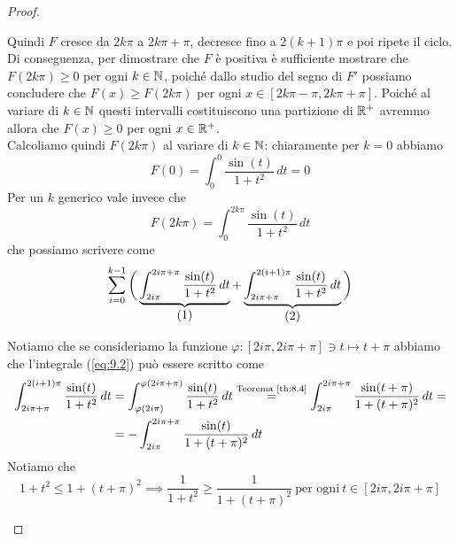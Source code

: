 \begin{proof}
\begin{enumerate}[(i)]
\begin{center}
        \end{center}
        Quindi $F$ cresce da $2k\pi$ a $2k\pi + \pi$, decresce fino a $2(k+1)\pi$ e poi ripete il ciclo. Di conseguenza, per dimostrare che $F$ è positiva è sufficiente mostrare che $F(2k\pi)\ge 0$ per ogni $k\in\amsbb{N}$, poiché dallo studio del segno di $F'$ possiamo concludere che $F(x)\ge F(2k\pi)$ per ogni $x\in[2k\pi -\pi , 2k\pi +\pi]$. Poiché al variare di $k\in\amsbb{N}$ questi intervalli costituiscono una partizione di $\amsbb{R}^+$ avremmo allora che $F(x)\ge 0$ per ogni $x\in\amsbb{R}^+$.\\
        Calcoliamo quindi $F(2k\pi)$ al variare di $k\in\amsbb{N}$: chiaramente per $k=0$ abbiamo
        \[
        F(0) =  \int_0^0 \frac{\sin(t)}{1+t^2}\, dt = 0
        \]
        Per un $k$ generico vale invece che
        \[
        F(2k\pi) = \int_0^{2k\pi}\frac{\sin(t)}{1+t^2}\, dt
        \]
        che possiamo scrivere come
        \[
        \sum_{i=0}^{k-1}\bigg(\underbrace{\int_{2i\pi}^{2i\pi +\pi} \frac{\sin(t)}{1+t^2}\, dt}_{\stepcounter{equation}\mbox{(\theequation)}} + \underbrace{\int_{2i\pi + \pi }^{2(i+1)\pi} \frac{\sin(t)}{1+t^2}\, dt}_{\stepcounter{equation}\mbox{(\theequation)}}\bigg)
        \]
        \addtocounter{equation}{-2}\label{eq:9.1}
        \addtocounter{equation}{0}\label{eq:9.2}
        Notiamo che se consideriamo la funzione $\varphi\colon [2i\pi, 2i\pi + \pi]\ni t \mapsto t+\pi$ abbiamo che l'integrale (\ref{eq:9.2}) può essere scritto come
        \[
        \begin{split}
            \int_{2i\pi +\pi}^{2(i+1)\pi} \frac{\sin(t)}{1+t^2}\, dt &= \int_{\varphi(2i\pi)}^{\varphi(2i\pi +\pi)} \frac{\sin(t)}{1+t^2}\, dt \overset{\text{Teorema \ref{th:8.4}}}{=} \int_{2i\pi}^{2i\pi +\pi} \frac{\sin(t+\pi)}{1+(t+\pi)^2}\, dt = \\
            & = -\int_{2i\pi}^{2i\pi +\pi} \frac{\sin(t)}{1+(t+\pi)^2}\, dt
        \end{split}
        \]
        Notiamo che 
        \[
        1+t^2 \le 1+(t+\pi)^2 \implies \frac{1}{1+t^2}\ge \frac{1}{1+(t+\pi)^2} \ \text{per ogni} \ t\in[2i\pi, 2i\pi+\pi]
\]
\end{enumerate}
\end{proof}
